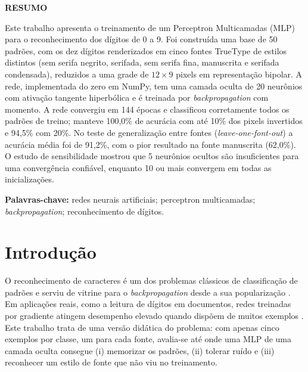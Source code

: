 \documentclass[12pt,a4paper]{article}
\begin{document}
\fazcapa
\fazfolhaderosto

\thispagestyle{empty}
\begin{center}\textbf{RESUMO}\end{center}
\vspace{2pt}
\begin{singlespace}
\noindent
Este trabalho apresenta o treinamento de um Perceptron Multicamadas (MLP) para o
reconhecimento dos dígitos de 0 a 9. Foi construída uma base de 50 padrões, com os dez
dígitos renderizados em cinco fontes TrueType de estilos distintos (sem serifa negrito,
serifada, sem serifa fina, manuscrita e serifada condensada), reduzidos a uma grade de
$12\times 9$ pixels em representação bipolar. A rede, implementada do zero em NumPy, tem uma
camada oculta de 20 neurônios com ativação tangente hiperbólica e é treinada por
\textit{backpropagation} com momento. A rede convergiu em 144 épocas e classificou
corretamente todos os padrões de treino; manteve 100,0\% de acurácia com até 10\% dos
pixels invertidos e 94,5\% com 20\%. No teste de generalização entre fontes
(\textit{leave-one-font-out}) a acurácia média foi de 91,2\%, com o pior resultado na fonte
manuscrita (62,0\%). O estudo de sensibilidade mostrou que 5 neurônios ocultos são
insuficientes para uma convergência confiável, enquanto 10 ou mais convergem em todas as
inicializações.

\vspace{6pt}
\noindent\textbf{Palavras-chave:} redes neurais artificiais; perceptron multicamadas;
\textit{backpropagation}; reconhecimento de dígitos.
\end{singlespace}
\newpage

\thispagestyle{empty}
\renewcommand{\contentsname}{\centering SUMÁRIO}
\begin{singlespace}
\tableofcontents
\end{singlespace}
\newpage

\pagestyle{abnt}

\section{Introdução}

O reconhecimento de caracteres é um dos problemas clássicos de classificação de padrões e
serviu de vitrine para o \textit{backpropagation} desde a sua popularização
\cite{rumelhart1986}. Em aplicações reais, como a leitura de dígitos em documentos,
redes treinadas por gradiente atingem desempenho elevado quando dispõem de muitos exemplos
\cite{lecun1998}. Este trabalho trata de uma versão didática do problema: com apenas cinco
exemplos por classe, um para cada fonte, avalia-se até onde uma MLP de uma camada oculta
consegue (i) memorizar os padrões, (ii) tolerar ruído e (iii) reconhecer um estilo de
fonte que não viu no treinamento.
\end{document}
